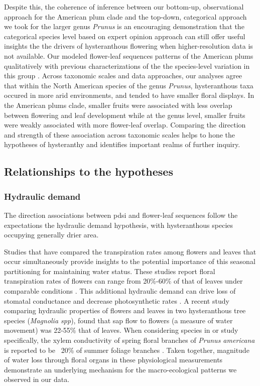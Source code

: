 \documentclass{article}[11pt]
\begin{document}
Despite this, the coherence of inference between our bottom-up, observational approach for the American plum clade and the top-down, categorical approach we took for the larger genus \emph{Prunus} is an encouraging demonstration that the categorical species level based on expert opinion approach can still offer useful insights the the drivers of hysteranthous flowering when higher-resolution data is not available. Our modeled flower-leaf sequences patterns of the American plums qualitatively with previous characterizations of the the species-level variation in this group \citep{}. Across taxonomic scales and data approaches, our analyses agree that within the North American species of the genus \emph{Prunus}, hysteranthous taxa occured in more arid environments, and tended to have smaller floral displays. In the American plums clade, smaller fruits were associated with less overlap between flowering and leaf development while at the genus level, smaller fruits were weakly associated with more flower-leaf overlap.  Comparing the direction and strength of these association across taxonomic scales helps to hone the hypotheses of hysteranthy and identifies important realms of further inquiry.

\subsection*{Relationships to the hypotheses}
\subsubsection*{Hydraulic demand}
The direction associations between pdsi and flower-leaf sequences follow the expectations the hydraulic demand hypothesis, with hysteranthous species occupying generally drier area. 

Studies that have compared the transpiration rates among flowers and leaves that occur simultaneously provide insights to the potential importance of this seasonal partitioning for maintaining water status. These studies report floral transpiration rates of flowers can range from 20\%-60\% of that of leaves under comparable conditions \citep{Whiley:1988uf,Roddy:2012wn}. This additional hydraulic demand can drive loss of stomatal conductance and  decrease photosynthetic rates \citep{Galen:1999vr}. A recent study \citet{Liu:2017wg} comparing hydraulic properties of flowers and leaves in two hysteranthous tree species (\textit{Magnolia spp}), found that sap flow to flowers (a measure of water movement) was 22-55\% that of leaves. When considering species in or study specifically, the xylem conductivity of spring floral branches of \textit{Prunus americana} is reported to be ~20\% of summer foliage branches \citep{McMann:2022ww}. Taken together, magnitude of water loss through floral organs in these physiological measurements demonstrate an underlying mechanism for the macro-ecological patterns we observed in our data.
\end{document}
